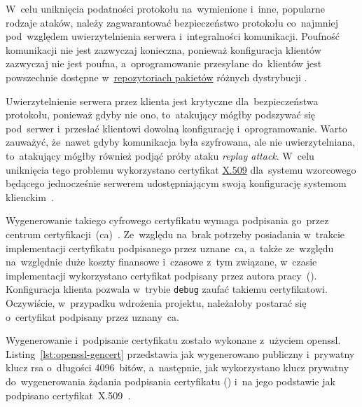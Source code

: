 \documentclass[thesis]{subfiles}
\begin{document}
W~celu uniknięcia podatności protokołu na~wymienione i~inne, popularne rodzaje ataków, należy zagwarantować bezpieczeństwo protokołu co~najmniej pod~względem uwierzytelnienia serwera i~integralności komunikacji. Poufność komunikacji nie jest zazwyczaj konieczna, ponieważ konfiguracja klientów zazwyczaj nie jest poufna, a~oprogramowanie przesyłane do~klientów jest powszechnie dostępne w~\href{https://wiki.archlinux.org/index.php/official_repositories}{repozytoriach pakietów} różnych dystrybucji . %

Uwierzytelnienie serwera przez klienta jest krytyczne dla~bezpieczeństwa protokołu, ponieważ gdyby nie ono, to~atakujący mógłby podszywać się pod~serwer i~przesłać klientowi dowolną konfigurację i~oprogramowanie. Warto zauważyć, że~nawet gdyby komunikacja była szyfrowana, ale nie uwierzytelniana, to~atakujący mógłby również podjąć próby ataku \emph{replay attack}. W~celu uniknięcia tego problemu wykorzystano certyfikat \href{https://en.wikipedia.org/wiki/X.509}{X.509} dla~systemu wzorcowego będącego jednocześnie serwerem udostępniającym swoją konfigurację systemom klienckim~\cite{wiki:x509}.

Wygenerowanie takiego cyfrowego certyfikatu wymaga podpisania go~przez centrum certyfikacji~(\gls{ca})~\cite{wiki:ca}. Ze~względu na~brak potrzeby posiadania w~trakcie implementacji certyfikatu podpisanego przez uznane~\gls{ca}, a~także ze~względu na~względnie duże koszty finansowe i~czasowe z~tym związane, w~czasie implementacji wykorzystano certyfikat podpisany przez autora pracy~(). Konfiguracja klienta pozwala w~trybie \texttt{debug} zaufać takiemu certyfikatowi. Oczywiście, w~przypadku wdrożenia projektu, należałoby postarać się o~certyfikat podpisany przez uznany~\gls{ca}.

Wygenerowanie i~podpisanie certyfikatu zostało wykonane z~użyciem \gls{openssl}. Listing~\ref{lst:openssl-gencert} przedstawia jak wygenerowano publiczny i~prywatny klucz \gls{rsa} o~długości 4096~bitów, a~następnie, jak wykorzystano klucz prywatny do~wygenerowania żądania podpisania certyfikatu () i~na jego podstawie jak podpisano certyfikat~X.509~\cite{openssl-cookbook,wiki:csr}.
\end{document}
